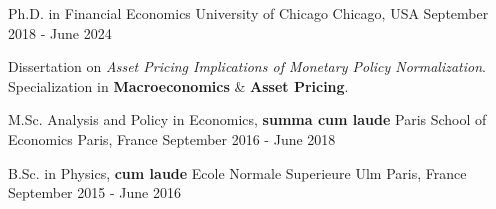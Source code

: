 

\begin{cventries}

	\cventry
	{Ph.D. in Financial Economics} %
	{University of Chicago} %
	{Chicago, USA} %
	{September 2018 - June 2024} %
	{\begin{cvitems}
			\item Dissertation on \textit{Asset Pricing Implications of Monetary Policy Normalization}. Specialization in \textbf{Macroeconomics} \& \textbf{Asset Pricing}.
		\end{cvitems}}

	\cventry
	{M.Sc. Analysis and Policy in Economics, \textbf{summa cum laude}} %
	{Paris School of Economics} %
	{Paris, France} %
	{September 2016 - June 2018} %
	{}

	\cventry
	{B.Sc. in Physics, \textbf{cum laude}} %
	{Ecole Normale Superieure Ulm} %
	{Paris, France} %
	{September 2015 - June 2016} %
	{}

\end{cventries}

